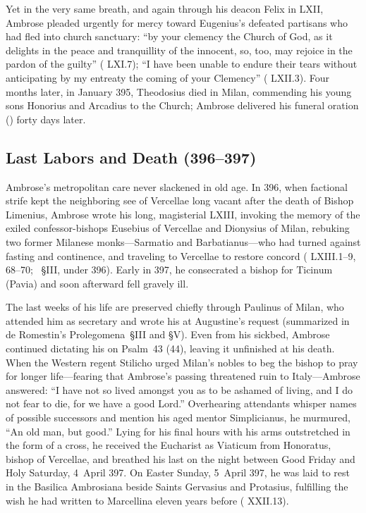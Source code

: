 Yet in the very same breath, and again through his deacon Felix in  LXII, Ambrose pleaded urgently for mercy toward Eugenius's defeated partisans who had fled into church sanctuary: ``by your clemency the Church of God, as it delights in the peace and tranquillity of the innocent, so, too, may rejoice in the pardon of the guilty'' ( LXI.7); ``I have been unable to endure their tears without anticipating by my entreaty the coming of your Clemency'' ( LXII.3). Four months later, in January 395, Theodosius died in Milan, commending his young sons Honorius and Arcadius to the Church; Ambrose delivered his funeral oration () forty days later.

\subsection{Last Labors and Death (396--397)}

Ambrose's metropolitan care never slackened in old age. In 396, when factional strife kept the neighboring see of Vercellae long vacant after the death of Bishop Limenius, Ambrose wrote his long, magisterial  LXIII, invoking the memory of the exiled confessor-bishops Eusebius of Vercellae and Dionysius of Milan, rebuking two former Milanese monks---Sarmatio and Barbatianus---who had turned against fasting and continence, and traveling to Vercellae to restore concord ( LXIII.1--9, 68--70; ~\S III, under 396). Early in 397, he consecrated a bishop for Ticinum (Pavia) and soon afterward fell gravely ill.

The last weeks of his life are preserved chiefly through Paulinus of Milan, who attended him as secretary and wrote his  at Augustine's request (summarized in de Romestin's Prolegomena~\S III and \S V). Even from his sickbed, Ambrose continued dictating his  on Psalm~43 (44), leaving it unfinished at his death. When the Western regent Stilicho urged Milan's nobles to beg the bishop to pray for longer life---fearing that Ambrose's passing threatened ruin to Italy---Ambrose answered: ``I have not so lived amongst you as to be ashamed of living, and I do not fear to die, for we have a good Lord.'' Overhearing attendants whisper names of possible successors and mention his aged mentor Simplicianus, he murmured, ``An old man, but good.'' Lying for his final hours with his arms outstretched in the form of a cross, he received the Eucharist as Viaticum from Honoratus, bishop of Vercellae, and breathed his last on the night between Good Friday and Holy Saturday, 4~April 397. On Easter Sunday, 5~April 397, he was laid to rest in the Basilica Ambrosiana beside Saints Gervasius and Protasius, fulfilling the wish he had written to Marcellina eleven years before ( XXII.13).

